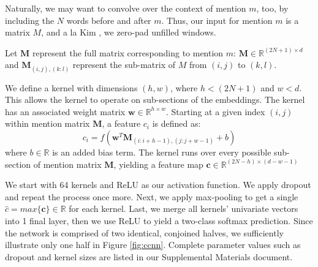 \documentclass[11pt,a4paper]{article}
\begin{document}
Naturally, we may want to convolve over the context of mention $m$, too, by including the $N$ words before and after $m$.  Thus, our input for mention $m$ is a matrix $M$, and a la Kim , we zero-pad unfilled windows.

\vspace{3mm}

Let $\textbf{M}$ represent the full matrix corresponding to mention $m$: $\textbf{M} \in \mathbb{R}^{(2N+1) \times d}$ and $\textbf{M}_{(i,j),(k:l)}$ represent the sub-matrix of $M$ from $(i,j)$ to $(k,l)$.

\vspace{3mm}

We define a kernel with dimensions $(h,w)$, where $h < (2N+1)$ and $w < d$.  This allows the kernel to operate on sub-sections of the embeddings.  The kernel has an associated weight matrix $\textbf{w} \in \mathbb{R}^{h \times w}$.  Starting at a given index $(i,j)$ within mention matrix $\textbf{M}$, a feature $c_{i}$ is defined as:
\begin{equation}
c_{i} = f(\textbf{w}^{T}\textbf{M}_{(i:i+h-1),(j:j+w-1)} + b)
\end{equation}
where $b \in \mathbb{R}$ is an added bias term.  The kernel runs over every possible sub-section of mention matrix $\textbf{M}$, yielding a feature map $\textbf{c} \in \mathbb{R}^{(2N-h) \times (d-w-1)}$

\vspace{3mm}

We start with 64 kernels and ReLU as our activation function.  We apply dropout and repeat the process once more. Next, we apply max-pooling to get a single $\hat{c} = max\{\textbf{c\}} \in \mathbb{R}$ for each kernel. Last, we merge all kernels' univariate vectors into 1 final layer, then we use ReLU to yield a two-class softmax prediction.  Since the network is comprised of two identical, conjoined halves, we sufficiently illustrate only one half in Figure \ref{fig:ccnn}.  Complete parameter values such as dropout and kernel sizes are listed in our Supplemental Materials document.
\end{document}
